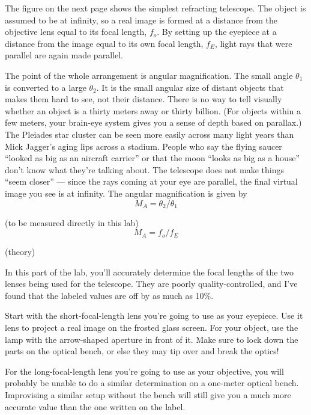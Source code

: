 \label{fig:telescope}

The figure on the next page
shows the simplest refracting telescope. The
object is assumed to be at infinity, so a real image is
formed at a distance from the objective lens equal to its
focal length, $f_o$. By setting up the eyepiece at a
distance from the image equal to its own focal length,
$f_E$, light rays that were parallel are again made parallel.

The point of the whole arrangement is angular magnification.
The small angle $\theta_1$ is converted to a large
$\theta_2$. It is the small angular size of distant objects
that makes them hard to see, not their distance. There is no
way to tell visually whether an object is a thirty meters
away or thirty billion. (For objects within a few meters,
your brain-eye system gives you a sense of depth based on
parallax.) The Pleiades star cluster can be seen more easily
across many light years than Mick Jagger's aging lips across
a stadium. People who say the flying saucer ``looked as big
as an aircraft carrier'' or that the moon ``looks as big as
a house'' don't know what they're talking about. The
telescope does not make things ``seem closer'' --- since the
rays coming at your eye are parallel, the final virtual
image you see is at infinity. The angular magnification is given by
\begin{equation*}
      M_A  =  \theta_2/\theta_1   
\end{equation*}

(to be measured directly in this lab)
\begin{equation*}
      M_A  =  f_o/f_E   
\end{equation*}

(theory)

\observations

In this part of the lab, you'll accurately determine the focal lengths of the two
lenses being used for the telescope. They are poorly quality-controlled, and I've
found that the labeled values are off by as much as 10\%.

Start with the short-focal-length lens you're going to use as your eyepiece.
Use it lens to project a real image on the
frosted glass screen. For your object, use the lamp with the
arrow-shaped aperture in front of it. Make sure to lock down
the parts on the optical bench, or else they may tip over
and break the optics!

For the long-focal-length lens you're going to use as your objective, you will
probably be unable to do a similar determination on a one-meter optical bench.
Improvising a similar setup without the bench will still give you a much more
accurate value than the one written on the label.

